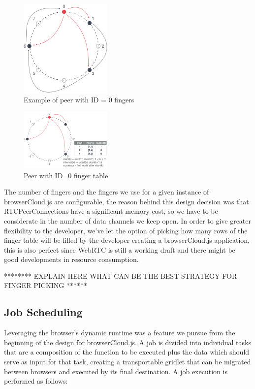 \begin{figure}[h!]
  \centering
  \includegraphics[width=0.4\textwidth]{figs/chord-5}
  \caption{Example of peer with ID = 0 fingers}
  \label{fig:c-5}
\end{figure}

\begin{figure}[h!]
  \centering
  \includegraphics[width=0.4\textwidth]{figs/chord-6}
  \caption{Peer with ID=0 finger table}
  \label{fig:c-6}
\end{figure}

The number of fingers and the fingers we use for a given instance of browserCloud.js are configurable, the reason behind this design decision was that RTCPeerConnections have a significant memory cost, so we have to be considerate in the number of data channels we keep open. In order to give greater flexibility to the developer, we've let the option of picking how many rows of the finger table will be filled by the developer creating a browserCloud.js application, this is also perfect since WebRTC is still a working draft and there might be good developments in resource consumption.

******** EXPLAIN HERE WHAT CAN BE THE BEST STRATEGY FOR FINGER PICKING ******



\subsection{Job Scheduling}

Leveraging the browser's dynamic runtime was a feature we pursue from the beginning of the design for browserCloud.js. A job is divided into individual tasks that are a composition of the function to be executed plus the data which should serve as input for that task, creating a transportable gridlet that can be migrated between browsers and executed by its final destination. A job execution is performed as follows:

